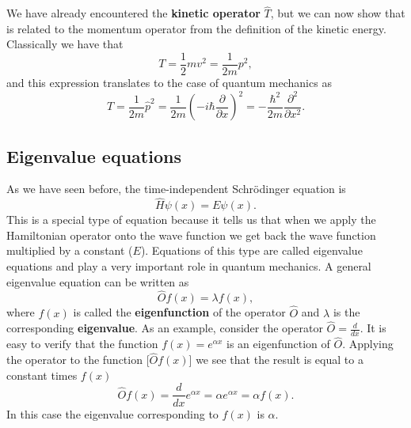 \documentclass[../Main/chem331-notes.tex]{subfiles}
\begin{document}
We have already encountered the \textbf{kinetic operator} $\hat{T}$, but we can now show that is related to the momentum operator from the definition of the kinetic energy. Classically we have that
\begin{equation}
T = \frac{1}{2} m v^2 = \frac{1}{2 m} p^2,
\end{equation}
and this expression translates to the case of quantum mechanics as
\begin{equation}
\hat{T} =  \frac{1}{2 m} \hat{p}^2 = \frac{1}{2 m} \left(  -i \hbar \frac{\partial}{\partial x} \right)^2 
= -\frac{\hbar^2}{2m} \frac{\partial^2}{\partial x^2}.
\end{equation}

\subsection{Eigenvalue equations}
As we have seen before, the time-independent Schr\"{o}dinger equation is
\begin{equation}
\hat{H}\psi(x) = E \psi(x).
\end{equation}
This is a special type of equation because it tells us that when we apply the Hamiltonian operator onto the wave function we get back the wave function multiplied by a constant ($E$).
Equations of this type are called eigenvalue equations and play a very important role in quantum mechanics.
A general eigenvalue equation can be written as
\begin{equation}
\hat{O} f(x) = \lambda f(x),
\end{equation}
where $f(x)$ is called the \textbf{eigenfunction} of the operator $\hat{O}$ and $\lambda$ is the corresponding \textbf{eigenvalue}.
As an example, consider the operator $\hat{O} = \frac{d}{dx}$.
It is easy to verify that the function $f(x) = e^{\alpha x}$ is an eigenfunction of $\hat{O}$. Applying the operator to the function [$\hat{O} f(x)$] we see that the result is equal to a constant times $f(x)$
\begin{equation}
\hat{O} f(x) = \frac{d}{dx} e^{\alpha x} = \alpha e^{\alpha x} = \alpha f(x).
\end{equation}
In this case the eigenvalue corresponding to $f(x)$ is $\alpha$.
\end{document}
